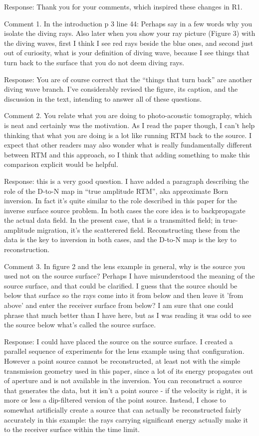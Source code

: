 \documentclass[12pt]{article}
\begin{document}
Response: Thank you for your comments, which inspired these changes in R1.

Comment 1. In the introduction p 3 line 44: Perhaps say in a few words why you isolate the diving rays.  Also later when you show your ray picture (Figure 3) with the diving waves, first I think I see red rays beside the blue ones, and second just out of curiosity, what is your definition of diving wave, because I see things that turn back to the surface that you do not deem diving rays.  

Response: You are of course correct that the ``things that turn back'' are another diving wave branch. I've considerably revised the figure, its caption, and the discussion in the text, intending to answer all of these questions.

Comment 2. You relate what you are doing to photo-acoustic tomography, which is neat and certainly was the motivation.  As I read the paper though, I can't help thinking that what you are doing is a lot like running RTM back to the source.  I expect that other readers may also wonder what is really fundamentally different between RTM and this approach, so I think that adding something to make this comparison explicit would be helpful.

Response: this is a very good question. I have added a paragraph describing the role of the D-to-N map in ``true amplitude RTM'', aka approximate Born inversion. In fact it's quite similar to the role described in this paper for the inverse surface source problem. In both cases the core idea is to backpropagate the actual data field. In the present case, that is a transmitted field; in true-amplitude migration, it's the scatterered field. Reconstructing these from the data is the key to inversion in both cases, and the D-to-N map is the key to reconstruction.
 
Comment 3. In figure 2 and the lens example in general, why is the source you used not on the source surface?  Perhaps I have misunderstood the meaning of the source surface, and that could be clarified.  I guess that the source should be below that surface so the rays come into it from below and then leave it 'from above' and enter the receiver surface from below?   I am sure that one could phrase that much better than I have here, but as I was reading it was odd to see the source below what's called the source surface.

Response: I could have placed the source on the source surface. I created a parallel sequence of experiments for the lens example using that configuration. However a point source cannot be reconstructed, at least not with the simple transmission geometry used in this paper, since a lot of its energy propagates out of aperture and is not available in the inversion. You can reconstruct a source that generates the data, but it isn't a point source - if the velocity is right, it is more or less a dip-filtered version of the point source. Instead, I chose to somewhat artificially create a source that can actually be reconstructed fairly accurately in this example: the rays carrying significant energy actually make it to the receiver surface within the time limit.
\end{document}
